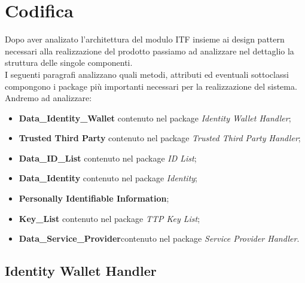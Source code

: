 
\chapter{Codifica}
\label{cap:codifica}
Dopo aver analizato l'architettura del modulo \gls{ITF} insieme ai design pattern necessari alla realizzazione del prodotto passiamo ad analizzare nel dettaglio la struttura delle singole componenti.\\
I seguenti paragrafi analizzano quali metodi, attributi ed eventuali sottoclassi compongono i package più importanti necessari per la realizzazione del sistema.\\
Andremo ad analizzare:
\begin{itemize}
	\item \textbf{Data\_Identity\_Wallet} contenuto nel package \textit{Identity Wallet Handler};
	\item \textbf{Trusted Third Party} contenuto nel package \textit{Trusted Third Party Handler};
	\item \textbf{Data\_ID\_List} contenuto nel package \textit{ID List};
	\item \textbf{Data\_Identity} contenuto nel package \textit{Identity};
	\item \textbf{Personally Identifiable Information};
	\item \textbf{Key\_List} contenuto nel package \textit{TTP Key List};
	\item \textbf{Data\_Service\_Provider}contenuto nel package \textit{Service Provider Handler}.
\end{itemize}
\section{Identity Wallet Handler}
